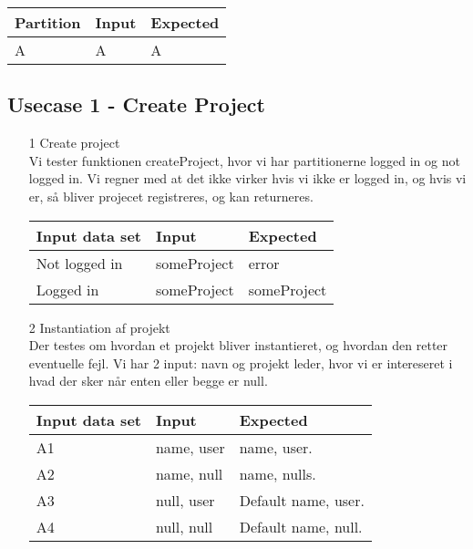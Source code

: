 \documentclass[a4paper,12pt]{article}
\begin{document}
\begin{center}
\begin{tabular}{|l|l|l|}
	\hline
	Partition & Input & Expected \\
	\hline
	A & A & A \\
	\hline
\end{tabular}
\end{center}

\subsection{Usecase 1 - Create Project}
\begin{enumerate}
	\item[1] Create project \\
		Vi tester funktionen createProject, hvor vi har partitionerne logged in og not logged in. Vi regner med at det ikke virker hvis vi ikke er logged in, og hvis vi er, så bliver projecet registreres, og kan returneres.
		\begin{center}
		\begin{tabular}{|l|l|l|}
			\hline
			Input data set & Input & Expected \\
			\hline
			Not logged in & someProject & error \\
			Logged in & someProject & someProject \\
			\hline
		\end{tabular}
		\end{center}
	\item[2] Instantiation af projekt \\
		Der testes om hvordan et projekt bliver instantieret, og hvordan den retter eventuelle fejl. Vi har 2 input: navn og projekt leder, hvor vi er intereseret i hvad der sker når enten eller begge er null.
		\begin{center}
		\begin{tabular}{|l|l|l|}
			\hline
			Input data set & Input & Expected \\
			\hline
			A1 & name, user & name, user. \\
			A2 & name, null & name, nulls. \\
			A3 & null, user & Default name, user. \\
			A4 & null, null & Default name, null. \\
			\hline
		\end{tabular}
		\end{center}
\end{enumerate}
\end{document}
